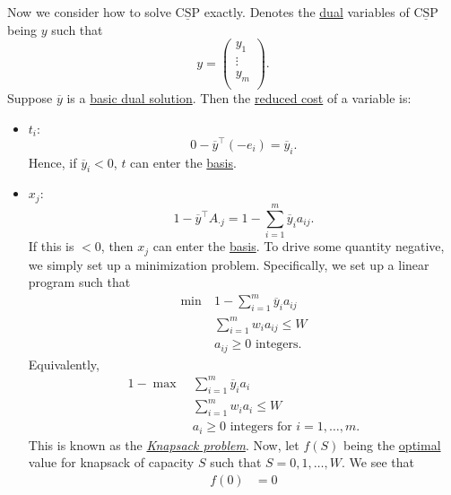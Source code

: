 \begin{answer}
	Now we consider how to solve \(\mathrm{\underline{CSP}}\) exactly. Denotes the \hyperref[def:dual]{dual} variables of \(\mathrm{\underline{CSP}}\) being \(y\) such that
	\[
		y = \begin{pmatrix}
			y_1    \\
			\vdots \\
			y_{m}  \\
		\end{pmatrix}.
	\]
	Suppose \(\overline{y}\) is a \hyperref[def:dual-basic-solution]{basic dual solution}. Then the \hyperref[def:reduced-cost]{reduced cost} of a variable is:
	\begin{itemize}
		\item \(t_{i}\):
		      \[
			      0 - \overline{y}^{\top}(-e_{i}) = \overline{y}_{i}.
		      \]
		      Hence, if \(\overline{y}_{i}<0\), \(t\) can enter the \hyperref[def:basis]{basis}.
		\item \(x_{j}\):
		      \[
			      1 - \overline{y}^{\top}A_{\cdot j} = 1 - \sum\limits_{i=1}^{m} \overline{y}_{i}a_{ij}.
		      \]
		      If this is \(<0\), then \(x_{j}\) can enter the \hyperref[def:basis]{basis}. To drive some quantity negative, we simply set up a minimization problem. Specifically, we set up a linear program such that
		      \[
			      \begin{aligned}
				      \min~ & 1 - \sum\limits_{i=1}^{m} \overline{y}_{i}a_{ij} \\
				            & \sum\limits_{i=1}^{m} w_{i}a_{ij}\leq W          \\
				            & a_{ij}\geq 0 \text{ integers}.
			      \end{aligned}
		      \]
		      Equivalently,
		      \[
			      \begin{aligned}
				      1 - \max~ & \sum\limits_{i=1}^{m} \overline{y}_{i}a_{i}        \\
				                & \sum\limits_{i=1}^{m} w_{i}a_{i}\leq W             \\
				                & a_{i}\geq 0 \text{ integers for }i = 1, \dots , m.
			      \end{aligned}
		      \]
		      This is known as the \emph{\href{https://en.wikipedia.org/wiki/Knapsack_problem}{Knapsack problem}}. Now, let \(f(S)\) being the \hyperref[def:optimal-solution]{optimal} value for knapsack of capacity \(S\) such that \(S = 0, 1, \dots , W\). We see that
		      \[
			      \begin{split}
				      f(0) & = 0                                                                         \\

\end{split}\]
\end{itemize}
\end{answer}
